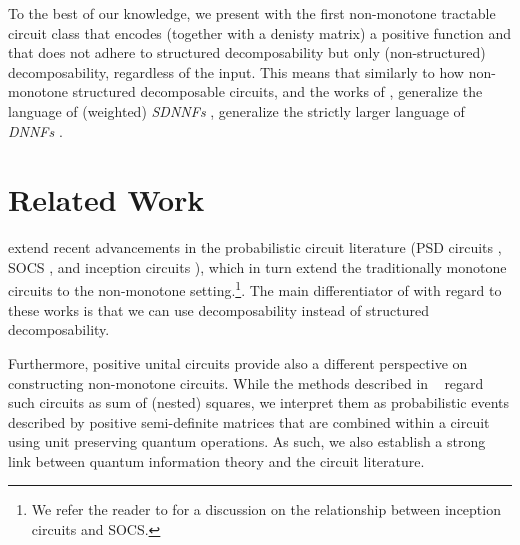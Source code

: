 To the best of our knowledge, we present with \dpuncs the first non-monotone tractable circuit class that encodes (together with a denisty matrix) a positive function and that does not adhere to structured decomposability but only (non-structured) decomposability, regardless of the input.
This means that similarly to how non-monotone structured decomposable circuits, \eg \sdpuncs and the works of \citep{sladek2023encoding,loconte2025sum,wangrelationship}, generalize the language of (weighted) \textit{SDNNFs} \citep{pipatsrisawat2008new}, \dpuncs generalize the strictly larger language of \textit{DNNFs} \citep{darwiche2001decomposable}.








\section{Related Work}
\label{sec:related}
\puncs extend recent advancements in the probabilistic circuit literature (PSD circuits \citep{sladek2023encoding}, SOCS \citep{loconte2025sum}, and inception circuits \citep{wangrelationship}),
which in turn extend the traditionally monotone circuits to the non-monotone setting.\footnote{We refer the reader to \citep[Section 5]{loconte2025sum} for a discussion on the relationship between inception circuits and SOCS.}.
The main differentiator of \puncs with regard to these works is that we can use decomposability instead of structured decomposability.



Furthermore, positive unital circuits provide also a different perspective on constructing non-monotone circuits. While the methods described in ~\citep{sladek2023encoding,loconte2024subtractive,loconte2025sum,wangrelationship} regard such circuits as sum of (nested) squares, we interpret them as probabilistic events described by positive semi-definite matrices that are combined within a circuit using unit preserving quantum operations. As such, we also establish a strong link between quantum information theory and the circuit literature.

